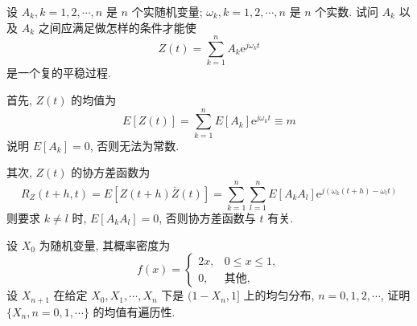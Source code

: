 \documentclass[boxes]{homework}
\begin{document}
\begin{problem}
设 $A_k, k = 1, 2, \cdots, n$ 是 $n$ 个实随机变量; $\omega_k, k = 1, 2, \cdots, n$ 是 $n$ 个实数. 试问
$A_k$ 以及 $A_k$ 之间应满足做怎样的条件才能使
\begin{equation}
    Z(t) = \sum_{k = 1}^n A_k\mathrm{e}^{j\omega_k t}
\end{equation}
是一个复的平稳过程.
\end{problem}
\begin{solution}
    首先, $Z(t)$ 的均值为
    \begin{equation}
        E[Z(t)] = \sum_{k = 1}^n E[A_k]\mathrm{e}^{j\omega_k t} \equiv m
    \end{equation}
    说明 $E[A_k] = 0$, 否则无法为常数.

    其次, $Z(t)$ 的协方差函数为
    \begin{equation}
        R_Z(t+h, t) = E[Z(t+h)\overline{Z}(t)] = \sum_{k = 1}^n\sum_{l = 1}^n E\left[A_kA_l\right]\mathrm{e}^{j(\omega_k (t+h) - \omega_l t)}
    \end{equation}
    则要求 $k\neq l$ 时, $E\left[A_kA_l\right] = 0$, 否则协方差函数与 $t$ 有关.
\end{solution}
\begin{problem}
设 $X_0$ 为随机变量, 其概率密度为
\begin{equation}
    f(x) = \begin{cases}
        2x, & 0\leq x\leq 1, \\
        0,  & \text{其他},
    \end{cases}
\end{equation}
设 $X_{n + 1}$ 在给定 $X_0, X_1, \cdots, X_n$ 下是 $(1-X_n, 1]$ 上的均匀分布, $n = 0, 1, 2, \cdots$,
证明 $\{X_n, n = 0, 1, \cdots\}$ 的均值有遍历性.
\end{problem}
\end{document}
